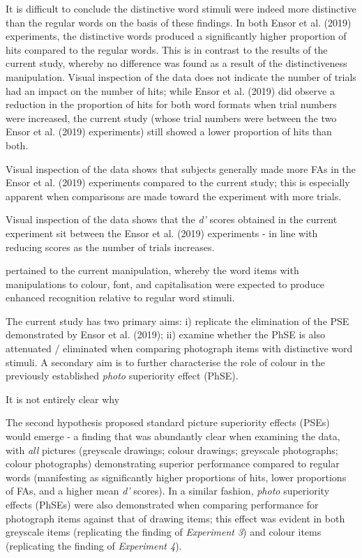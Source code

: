 \documentclass[
  11pt,
]{article}
\begin{document}
It is difficult to conclude the distinctive word stimuli were indeed
more distinctive than the regular words on the basis of these findings.
In both Ensor et al. (2019) experiments, the distinctive words produced
a significantly higher proportion of hits compared to the regular words.
This is in contrast to the results of the current study, whereby no
difference was found as a result of the distinctiveness manipulation.
Visual inspection of the data does not indicate the number of trials had
an impact on the number of hits; while Ensor et al. (2019) did observe a
reduction in the proportion of hits for both word formats when trial
numbers were increased, the current study (whose trial numbers were
between the two Ensor et al. (2019) experiments) still showed a lower
proportion of hits than both.

Visual inspection of the data shows that subjects generally made more
FAs in the Ensor et al. (2019) experiments compared to the current
study; this is especially apparent when comparisons are made toward the
experiment with more trials.

Visual inspection of the data shows that the \emph{d'} scores obtained
in the current experiment sit between the Ensor et al. (2019)
experiments - in line with reducing scores as the number of trials
increases.

pertained to the current manipulation, whereby the word items with
manipulations to colour, font, and capitalisation were expected to
produce enhanced recognition relative to regular word stimuli.

The current study has two primary aims: i) replicate the elimination of
the PSE demonstrated by Ensor et al. (2019); ii) examine whether the
PhSE is also attenuated / eliminated when comparing photograph items
with distinctive word stimuli. A secondary aim is to further
characterise the role of colour in the previously established
\emph{photo} superiority effect (PhSE).

It is not entirely clear why

The second hypothesis proposed standard picture superiority effects
(PSEs) would emerge - a finding that was abundantly clear when examining
the data, with \emph{all} pictures (greyscale drawings; colour drawings;
greyscale photographs; colour photographs) demonstrating superior
performance compared to regular words (manifesting as significantly
higher proportions of hits, lower proportions of FAs, and a higher mean
\emph{d'} scores). In a similar fashion, \emph{photo} superiority
effects (PhSEs) were also demonstrated when comparing performance for
photograph items against that of drawing items; this effect was evident
in both greyscale items (replicating the finding of \emph{Experiment 3})
and colour items (replicating the finding of \emph{Experiment 4}).
\end{document}
